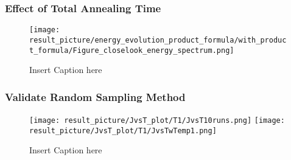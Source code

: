 \documentclass{beamer}
\begin{document}
\begin{frame}
	\frametitle{Effect of Total Annealing Time}
	\begin{figure}
		\centering
		\texttt{[image: result\_picture/energy\_evolution\_product\_formula/with\_product\_formula/Figure\_closelook\_energy\_spectrum.png]}
		
		\caption{Insert Caption here}
	\end{figure}
\end{frame}

\begin{frame}
	\frametitle{Validate Random Sampling Method}
	\begin{figure}
		\centering
		\texttt{[image: result\_picture/JvsT\_plot/T1/JvsT10runs.png]}
		\hfill
		\texttt{[image: result\_picture/JvsT\_plot/T1/JvsTwTemp1.png]}		
		
		\caption{Insert Caption here}
	\end{figure}
\end{frame}



\end{document}
